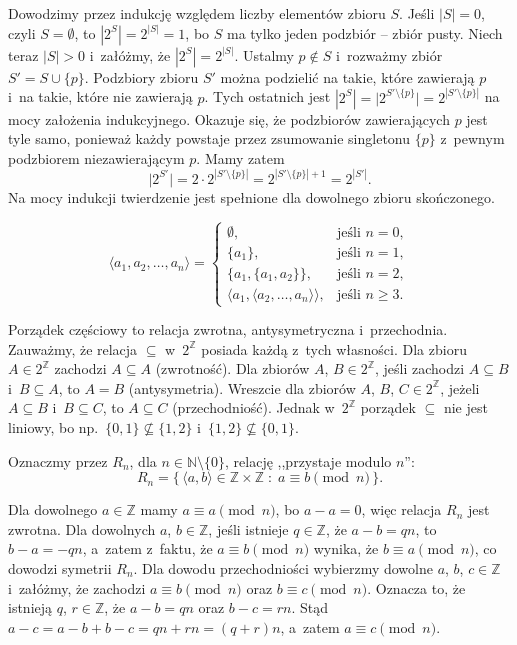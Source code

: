 \exercise %
Dowodzimy przez indukcję względem liczby elementów zbioru $S$.
Jeśli $|S|=0$, czyli $S=\emptyset$, to $|2^S|=2^{|S|}=1$, bo $S$ ma tylko jeden podzbiór -- zbiór pusty.
Niech teraz $|S|>0$ i~załóżmy, że $|2^S|=2^{|S|}$.
Ustalmy $p\notin S$ i~rozważmy zbiór $S'=S\cup\{p\}$.
Podzbiory zbioru $S'$ można podzielić na takie, które zawierają $p$ i~na takie, które nie zawierają $p$.
Tych ostatnich jest $|2^S|=\bigl|2^{S'\setminus\{p\}}\bigr|=2^{|S'\setminus\{p\}|}$ na mocy założenia indukcyjnego.
Okazuje się, że podzbiorów zawierających $p$ jest tyle samo, ponieważ każdy powstaje przez zsumowanie singletonu $\{p\}$ z~pewnym podzbiorem niezawierającym $p$.
Mamy zatem
\[
	\bigl|2^{S'}\bigr|=2\cdot2^{|S'\setminus\{p\}|} = 2^{|S'\setminus\{p\}|+1} = 2^{|S'|}.
\]
Na mocy indukcji twierdzenie jest spełnione dla dowolnego zbioru skończonego.

\exercise %
\[
	\langle a_1,a_2,\dots,a_n\rangle =
	\begin{cases}
		\emptyset, & \text{jeśli $n=0$}, \\
		\{a_1\}, & \text{jeśli $n=1$}, \\
		\{a_1,\{a_1,a_2\}\}, & \text{jeśli $n=2$}, \\
		\langle a_1,\langle a_2,\dots,a_n\rangle\rangle, & \text{jeśli $n\ge3$}.
	\end{cases}
\]


\exercise %
Porządek częściowy to relacja zwrotna, antysymetryczna i~przechodnia.
Zauważmy, że relacja $\subseteq$ w~$2^\mathbb{Z}$ posiada każdą z~tych własności.
Dla zbioru $A\in2^\mathbb{Z}$ zachodzi $A\subseteq A$ (zwrotność).
Dla zbiorów $A$, $B\in2^\mathbb{Z}$, jeśli zachodzi $A\subseteq B$ i~$B\subseteq A$, to $A=B$ (antysymetria).
Wreszcie dla zbiorów $A$, $B$, $C\in2^\mathbb{Z}$, jeżeli $A\subseteq B$ i~$B\subseteq C$, to $A\subseteq C$ (przechodniość).
Jednak w~$2^\mathbb{Z}$ porządek $\subseteq$ nie jest liniowy, bo np.\ $\{0,1\}\nsubseteq\{1,2\}$ i~$\{1,2\}\nsubseteq\{0,1\}$.

\exercise %
Oznaczmy przez $R_n$, dla $n\in\mathbb{N}\setminus\{0\}$, relację ,,przystaje modulo $n$'':
\[
	R_n = \bigl\{\,\langle a,b\rangle\in\mathbb{Z}\times\mathbb{Z}\;:\;a\equiv b\!\!\!\pmod{n}\,\bigr\}.
\]

Dla dowolnego $a\in\mathbb{Z}$ mamy $a\equiv a\pmod{n}$, bo $a-a=0$, więc relacja $R_n$ jest zwrotna.
Dla dowolnych $a$, $b\in\mathbb{Z}$, jeśli istnieje $q\in\mathbb{Z}$, że $a-b=qn$, to $b-a=-qn$, a~zatem z~faktu, że $a\equiv b\pmod{n}$ wynika, że $b\equiv a\pmod{n}$, co dowodzi symetrii $R_n$.
Dla dowodu przechodniości wybierzmy dowolne $a$, $b$, $c\in\mathbb{Z}$ i~załóżmy, że zachodzi $a\equiv b\pmod{n}$ oraz $b\equiv c\pmod{n}$.
Oznacza to, że istnieją $q$, $r\in\mathbb{Z}$, że $a-b=qn$ oraz $b-c=rn$.
Stąd $a-c=a-b+b-c=qn+rn=(q+r)n$, a~zatem $a\equiv c\pmod{n}$.

